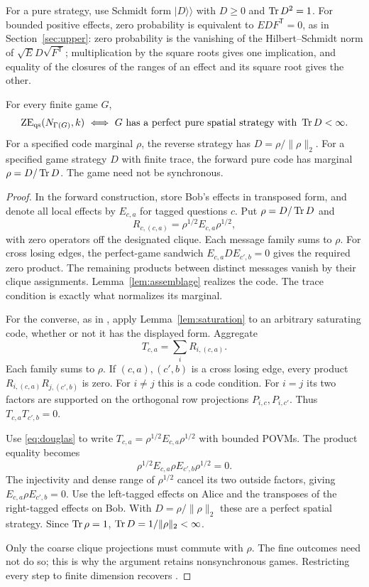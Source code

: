 For a pure strategy, use Schmidt form $|D\rangle\!\rangle$ with $D\geq0$ and $\operatorname{Tr} D^2=1$. For bounded positive effects, zero probability is equivalent to $EDF^{\mathsf T}=0$, as in Section~\ref{sec:upper}: zero probability is the vanishing of the Hilbert--Schmidt norm of $\sqrt E D\sqrt{F^{\mathsf T}}$; multiplication by the square roots gives one implication, and equality of the closures of the ranges of an effect and its square root gives the other.

\begin{theorem}\label{thm:correspondence}
For every finite game $G$,
\[
 \mathrm{ZE}_{\mathrm{qs}}(N_{\Gamma(G)},k)
 \ \Longleftrightarrow\
 G\text{ has a perfect pure spatial strategy with }\operatorname{Tr} D<\infty.
\]
For a specified code marginal $\rho$, the reverse strategy has $D=\rho/\|\rho\|_2$. For a specified game strategy $D$ with finite trace, the forward pure code has marginal $\rho=D/\operatorname{Tr} D$. The game need not be synchronous.
\end{theorem}
\begin{proof}
In the forward construction, store Bob's effects in transposed form, and denote all local effects by $E_{c,a}$ for tagged questions $c$. Put $\rho=D/\operatorname{Tr} D$ and
\[
 R_{c,(c,a)}=\rho^{1/2}E_{c,a}\rho^{1/2},
\]
with zero operators off the designated clique. Each message family sums to $\rho$. For cross losing edges, the perfect-game sandwich $E_{c,a}DE_{c',b}=0$ gives the required zero product. The remaining products between distinct messages vanish by their clique assignments. Lemma~\ref{lem:assemblage} realizes the code. The trace condition is exactly what normalizes its marginal.

For the converse, as in \cite[Theorem~6]{Mancinska}, apply Lemma~\ref{lem:saturation} to an arbitrary saturating code, whether or not it has the displayed form. Aggregate
\[
 T_{c,a}=\sum_iR_{i,(c,a)}.
\]
Each family sums to $\rho$. If $(c,a),(c',b)$ is a cross losing edge, every product $R_{i,(c,a)}R_{j,(c',b)}$ is zero. For $i\ne j$ this is a code condition. For $i=j$ its two factors are supported on the orthogonal row projections $P_{i,c},P_{i,c'}$. Thus $T_{c,a}T_{c',b}=0$.

Use \eqref{eq:douglas} to write $T_{c,a}=\rho^{1/2}E_{c,a}\rho^{1/2}$ with bounded POVMs. The product equality becomes
\[
 \rho^{1/2}E_{c,a}\rho E_{c',b}\rho^{1/2}=0.
\]
The injectivity and dense range of $\rho^{1/2}$ cancel its two outside factors, giving $E_{c,a}\rho E_{c',b}=0$. Use the left-tagged effects on Alice and the transposes of the right-tagged effects on Bob. With $D=\rho/\|\rho\|_2$ these are a perfect spatial strategy. Since $\operatorname{Tr}\rho=1$, $\operatorname{Tr} D=1/\|\rho\|_2<\infty$.

Only the coarse clique projections must commute with $\rho$. The fine outcomes need not do so; this is why the argument retains nonsynchronous games. Restricting every step to finite dimension recovers \cite[Theorem~6]{Mancinska}.
\end{proof}

